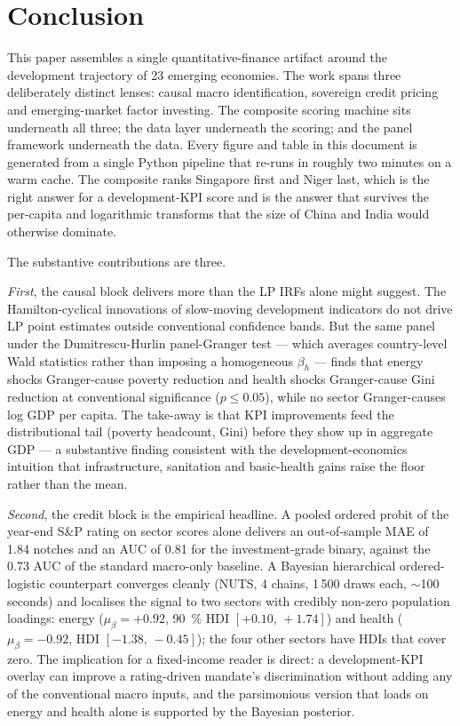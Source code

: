 \section{Conclusion}\label{sec:conclusion}

This paper assembles a single quantitative-finance artifact around the development trajectory of 23 emerging economies. The work spans three deliberately distinct lenses: causal macro identification, sovereign credit pricing and emerging-market factor investing. The composite scoring machine sits underneath all three; the data layer underneath the scoring; and the panel framework underneath the data. Every figure and table in this document is generated from a single Python pipeline that re-runs in roughly two minutes on a warm cache. The composite ranks Singapore first and Niger last, which is the right answer for a development-KPI score and is the answer that survives the per-capita and logarithmic transforms that the size of China and India would otherwise dominate.

The substantive contributions are three.

\emph{First}, the causal block delivers more than the LP IRFs alone might suggest. The Hamilton-cyclical innovations of slow-moving development indicators do not drive LP point estimates outside conventional confidence bands. But the same panel under the Dumitrescu-Hurlin panel-Granger test --- which averages country-level Wald statistics rather than imposing a homogeneous $\beta_h$ --- finds that energy shocks Granger-cause poverty reduction and health shocks Granger-cause Gini reduction at conventional significance ($p \le 0.05$), while no sector Granger-causes log GDP per capita. The take-away is that KPI improvements feed the distributional tail (poverty headcount, Gini) before they show up in aggregate GDP --- a substantive finding consistent with the development-economics intuition that infrastructure, sanitation and basic-health gains raise the floor rather than the mean.

\emph{Second}, the credit block is the empirical headline. A pooled ordered probit of the year-end S\&P rating on sector scores alone delivers an out-of-sample MAE of 1.84 notches and an AUC of 0.81 for the investment-grade binary, against the 0.73 AUC of the standard macro-only baseline. A Bayesian hierarchical ordered-logistic counterpart converges cleanly (NUTS, 4 chains, 1\,500 draws each, $\sim$100 seconds) and localises the signal to two sectors with credibly non-zero population loadings: energy ($\mu_\beta = +0.92$, 90~\% HDI $[+0.10,\,+1.74]$) and health ($\mu_\beta = -0.92$, HDI $[-1.38,\,-0.45]$); the four other sectors have HDIs that cover zero. The implication for a fixed-income reader is direct: a development-KPI overlay can improve a rating-driven mandate's discrimination without adding any of the conventional macro inputs, and the parsimonious version that loads on energy and health alone is supported by the Bayesian posterior.

